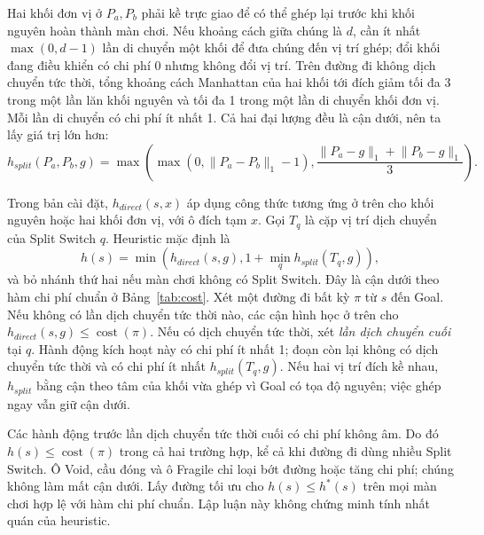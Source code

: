 Hai khối đơn vị ở $P_a,P_b$ phải kề trực giao để có thể ghép lại trước khi
khối nguyên hoàn thành màn chơi. Nếu khoảng cách giữa chúng là $d$, cần ít nhất
$\max(0,d-1)$ lần di chuyển một khối để đưa chúng đến vị trí ghép; đổi khối
đang điều khiển có chi phí 0 nhưng không đổi vị trí. Trên đường đi không dịch
chuyển tức thời, tổng khoảng cách Manhattan của hai khối tới đích giảm tối đa
3 trong một lần lăn khối nguyên và tối đa 1 trong một lần di chuyển khối đơn
vị. Mỗi lần di chuyển có chi phí ít nhất 1. Cả hai đại lượng đều là cận dưới,
nên ta lấy giá trị lớn hơn:
\begin{equation}
h_{split}(P_a,P_b,g)=\max\left(\max(0,\lVert P_a-P_b\rVert_1-1),
\frac{\lVert P_a-g\rVert_1+\lVert P_b-g\rVert_1}{3}\right).
\end{equation}

Trong bản cài đặt, $h_{direct}(s,x)$ áp dụng công thức tương ứng ở trên cho
khối nguyên hoặc hai khối đơn vị, với ô đích tạm $x$. Gọi $T_q$ là cặp vị trí
dịch chuyển của Split Switch $q$. Heuristic mặc định là
\begin{equation}
h(s)=\min\left(h_{direct}(s,g),1+\min_q h_{split}(T_q,g)\right),
\end{equation}
và bỏ nhánh thứ hai nếu màn chơi không có Split Switch. Đây là cận dưới theo
hàm chi phí chuẩn ở Bảng~\ref{tab:cost}. Xét một đường đi bất kỳ $\pi$ từ $s$
đến Goal. Nếu không có lần dịch chuyển tức thời nào, các cận hình học ở trên cho
$h_{direct}(s,g)\leq\operatorname{cost}(\pi)$. Nếu có dịch chuyển tức thời, xét
\emph{lần dịch chuyển cuối} tại $q$. Hành động kích hoạt này có chi phí ít nhất
1; đoạn còn lại không có dịch chuyển tức thời và có chi phí ít nhất
$h_{split}(T_q,g)$. Nếu hai vị trí đích kề nhau, $h_{split}$ bằng cận theo tâm
của khối vừa ghép vì Goal có tọa độ nguyên; việc ghép ngay vẫn giữ cận dưới.

Các hành động trước lần dịch chuyển tức thời cuối có chi phí không âm. Do đó
$h(s)\leq\operatorname{cost}(\pi)$ trong cả hai trường hợp, kể cả khi đường đi
dùng nhiều Split Switch. Ô Void, cầu đóng và ô Fragile chỉ loại bớt đường hoặc
tăng chi phí; chúng không làm mất cận dưới. Lấy đường tối ưu cho
$h(s)\leq h^*(s)$ trên mọi màn chơi hợp lệ với hàm chi phí chuẩn. Lập luận này
không chứng minh tính nhất quán của heuristic.

